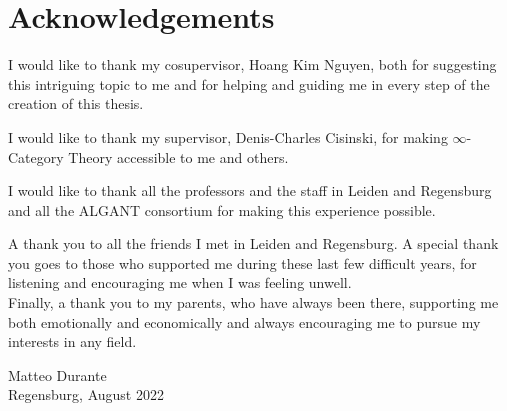 \chapter*{Acknowledgements}

I would like to thank my cosupervisor, Hoang Kim Nguyen, both for suggesting
this intriguing topic to me and for helping and guiding me in every step of the
creation of this thesis.

\noindent I would like to thank my supervisor, Denis-Charles Cisinski, for
making $\infty$-Category Theory accessible to me and others.

\noindent I would like to thank all the professors and the staff in Leiden and
Regensburg and all the ALGANT consortium for making this experience
possible.

\noindent A thank you to all the friends I met in Leiden and Regensburg. A
special thank you goes to those who supported me during these last few difficult
years, for listening and encouraging me when I was feeling unwell.\\

\noindent Finally, a thank you to my parents, who have always been there,
supporting me both emotionally and economically and always encouraging me to
pursue my interests in any field.

\begin{flushright}
	Matteo Durante \\ Regensburg, August 2022
\end{flushright}
